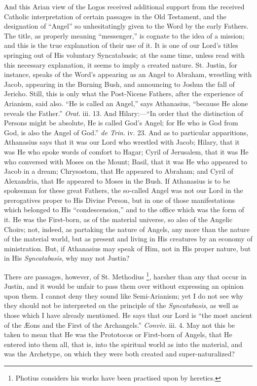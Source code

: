 And this Arian view of the Logos received additional support from
the received Catholic interpretation of certain passages in the Old
Testament, and the designation of ``Angel'' so unhesitatingly
given to the Word by the early Fathers. The title, as properly meaning
``messenger,'' is cognate to the idea of a mission; and this
is the true explanation of their use of it. It is one of our Lord's
titles springing out of His voluntary Syncatabasis; at the same time,
unless read with this necessary explanation, it seems to imply a
created nature. St. Justin, for instance, speaks of the Word's
appearing as an Angel to Abraham, wrestling with Jacob, appearing in
the Burning Bush, and announcing to Joshua the fall of Jericho. Still,
this is only what the Post-Nicene Fathers, after the experience of
Arianism, said also. ``He is called an Angel,'' says
Athanasius, ``because He alone reveals the Father.'' \emph{Orat}.
iii. 13. And Hilary:—``In order that the distinction of Persons
might be absolute, He is called God's Angel; for He who is God
from God, is also the Angel of God.'' \emph{de Trin}. iv. 23. And
as to particular apparitions, Athanasius says that it was our Lord who
wrestled with Jacob; Hilary, that it was He who spoke words of comfort
to Hagar; Cyril of Jerusalem, that it was He who conversed with Moses
on the Mount; Basil, that it was He who appeared to Jacob in a dream;
Chrysostom, that He appeared to Abraham; and Cyril of Alexandria, that
He appeared to Moses in the Bush. If Athanasius is to be spokesman for
these great Fathers, the so-called Angel was not our Lord in the
prerogatives proper to His Divine Person, but in one of those
manifestations which belonged to His ``condescension,'' and to
the office which was the form of it. He was the First-born, as of the
material universe, so also of the Angelic Choirs; not, indeed, as
partaking the nature of Angels, any more than the nature of the
material world, but as present and living in His creatures by an
economy of ministration. But, if Athanasius may speak of Him, not in
His proper nature, but in His \emph{Syncatabasis}, why may not Justin?

There are passages, however, of St. Methodius \footnote{Photius
considers his works have been practised upon by heretics.}, harsher than any that occur in Justin, and it would be unfair
to pass them over without expressing an opinion upon them. I cannot
deny they sound like Semi-Arianism; yet I do not see why they should
not be interpreted on the principle of the \emph{Syncatabasis}, as
well as those which I have already mentioned. He says that our Lord is
``the most ancient of the Æons and the First of the
Archangels.'' \emph{Conviv}. iii. 4. May not this be taken to mean
that He was the Prototocos or First-born of Angels, that He entered
into them all, that is, into the spiritual world as into the material,
and was the Archetype, on which they were both created and
super-naturalized?

